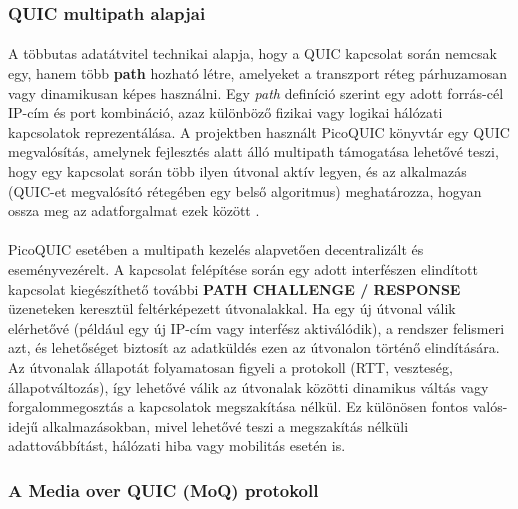\documentclass[a4paper,oneside]{article}
\begin{document}
\subsubsection{QUIC multipath alapjai}
\paragraph{}
A többutas adatátvitel technikai alapja, hogy a QUIC kapcsolat során nemcsak egy, 
hanem több \textbf{path}
hozható létre, amelyeket a transzport réteg párhuzamosan vagy dinamikusan képes használni. 
Egy \emph{path} definíció szerint egy adott forrás-cél IP-cím és port kombináció, azaz 
különböző fizikai vagy logikai hálózati kapcsolatok reprezentálása. 
A projektben használt PicoQUIC könyvtár egy QUIC megvalósítás, amelynek fejlesztés alatt álló multipath 
támogatása lehetővé teszi, hogy egy kapcsolat során több ilyen útvonal aktív legyen, és az 
alkalmazás (QUIC-et megvalósító rétegében egy belső algoritmus) meghatározza, 
hogyan ossza meg az adatforgalmat ezek között \cite{pico_git}.
\paragraph{}
PicoQUIC esetében a multipath kezelés alapvetően decentralizált és eseményvezérelt. 
A kapcsolat felépítése során egy adott interfészen elindított kapcsolat kiegészíthető 
további \textbf{PATH CHALLENGE / RESPONSE} üzeneteken keresztül feltérképezett 
útvonalakkal. Ha egy új útvonal válik elérhetővé (például egy új IP-cím vagy interfész 
aktiválódik), a rendszer felismeri azt, és lehetőséget biztosít az adatküldés ezen 
az útvonalon történő elindítására. Az útvonalak állapotát folyamatosan figyeli a protokoll 
(RTT, veszteség, állapotváltozás), így lehetővé válik az útvonalak közötti dinamikus 
váltás vagy forgalommegosztás a kapcsolatok megszakítása nélkül. Ez különösen 
fontos valós-idejű alkalmazásokban, mivel lehetővé teszi a megszakítás nélküli adattovábbítást, hálózati hiba vagy mobilitás esetén is.

\subsubsection{A Media over QUIC (MoQ) protokoll}
\paragraph{}
\end{document}
